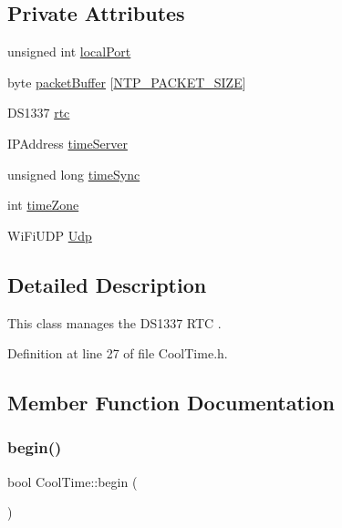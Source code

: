 \subsection*{Private Attributes}
\begin{DoxyCompactItemize}
\item 
unsigned int \hyperlink{classCoolTime_a2f777da44d7ba678be8185299e9b49d1}{local\+Port}
\item 
byte \hyperlink{classCoolTime_a27e6abc82a5c2f72161956967005bec7}{packet\+Buffer} \mbox{[}\hyperlink{CoolTime_8h_a56a6ea64006651b4f42adf713e244f06}{N\+T\+P\+\_\+\+P\+A\+C\+K\+E\+T\+\_\+\+S\+I\+ZE}\mbox{]}
\item 
D\+S1337 \hyperlink{classCoolTime_afa77d58c0c21cfe8b7c27e34d82f07b9}{rtc}
\item 
I\+P\+Address \hyperlink{classCoolTime_ad2b9858f399108cb440dd1e908916f04}{time\+Server}
\item 
unsigned long \hyperlink{classCoolTime_a9d032e76c3470a15b3bbbc52af6463f7}{time\+Sync}
\item 
int \hyperlink{classCoolTime_a1916d98810c2a4e9ba72867e8c1b9a99}{time\+Zone}
\item 
Wi\+Fi\+U\+DP \hyperlink{classCoolTime_a4e23216a8121ca79d0fb019f30884b92}{Udp}
\end{DoxyCompactItemize}


\subsection{Detailed Description}
This class manages the D\+S1337 R\+TC . 

Definition at line 27 of file Cool\+Time.\+h.



\subsection{Member Function Documentation}
\mbox{\label{classCoolTime_a2b36c4009f083ece2d407fec077c4938}} 
\subsubsection{\texorpdfstring{begin()}{begin()}}
{\footnotesize\ttfamily bool Cool\+Time\+::begin (\begin{DoxyParamCaption}{ }\end{DoxyParamCaption})}

